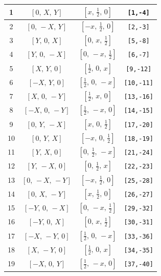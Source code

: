 \documentclass[fleqn,8pt]{jsarticle}
\begin{document}
\begin{longtable}{cccc}
1 & $\left[ 0,\, X,\, Y \right]$ & $\left[ x,\, \frac{1}{2},\, 0 \right]$ & {\tt [1,-4]} \\ \hline
2 & $\left[ 0,\, - X,\, Y \right]$ & $\left[ - x,\, \frac{1}{2},\, 0 \right]$ & {\tt [2,-3]} \\ \hline
3 & $\left[ Y,\, 0,\, X \right]$ & $\left[ 0,\, x,\, \frac{1}{2} \right]$ & {\tt [5,-8]} \\ \hline
4 & $\left[ Y,\, 0,\, - X \right]$ & $\left[ 0,\, - x,\, \frac{1}{2} \right]$ & {\tt [6,-7]} \\ \hline
5 & $\left[ X,\, Y,\, 0 \right]$ & $\left[ \frac{1}{2},\, 0,\, x \right]$ & {\tt [9,-12]} \\ \hline
6 & $\left[ - X,\, Y,\, 0 \right]$ & $\left[ \frac{1}{2},\, 0,\, - x \right]$ & {\tt [10,-11]} \\ \hline
7 & $\left[ X,\, 0,\, - Y \right]$ & $\left[ \frac{1}{2},\, x,\, 0 \right]$ & {\tt [13,-16]} \\ \hline
8 & $\left[ - X,\, 0,\, - Y \right]$ & $\left[ \frac{1}{2},\, - x,\, 0 \right]$ & {\tt [14,-15]} \\ \hline
9 & $\left[ 0,\, Y,\, - X \right]$ & $\left[ x,\, 0,\, \frac{1}{2} \right]$ & {\tt [17,-20]} \\ \hline
10 & $\left[ 0,\, Y,\, X \right]$ & $\left[ - x,\, 0,\, \frac{1}{2} \right]$ & {\tt [18,-19]} \\ \hline
11 & $\left[ Y,\, X,\, 0 \right]$ & $\left[ 0,\, \frac{1}{2},\, - x \right]$ & {\tt [21,-24]} \\ \hline
12 & $\left[ Y,\, - X,\, 0 \right]$ & $\left[ 0,\, \frac{1}{2},\, x \right]$ & {\tt [22,-23]} \\ \hline
13 & $\left[ 0,\, - X,\, - Y \right]$ & $\left[ - x,\, \frac{1}{2},\, 0 \right]$ & {\tt [25,-28]} \\ \hline
14 & $\left[ 0,\, X,\, - Y \right]$ & $\left[ x,\, \frac{1}{2},\, 0 \right]$ & {\tt [26,-27]} \\ \hline
15 & $\left[ - Y,\, 0,\, - X \right]$ & $\left[ 0,\, - x,\, \frac{1}{2} \right]$ & {\tt [29,-32]} \\ \hline
16 & $\left[ - Y,\, 0,\, X \right]$ & $\left[ 0,\, x,\, \frac{1}{2} \right]$ & {\tt [30,-31]} \\ \hline
17 & $\left[ - X,\, - Y,\, 0 \right]$ & $\left[ \frac{1}{2},\, 0,\, - x \right]$ & {\tt [33,-36]} \\ \hline
18 & $\left[ X,\, - Y,\, 0 \right]$ & $\left[ \frac{1}{2},\, 0,\, x \right]$ & {\tt [34,-35]} \\ \hline
19 & $\left[ - X,\, 0,\, Y \right]$ & $\left[ \frac{1}{2},\, - x,\, 0 \right]$ & {\tt [37,-40]} \\ \hline

\end{longtable}
\end{document}
